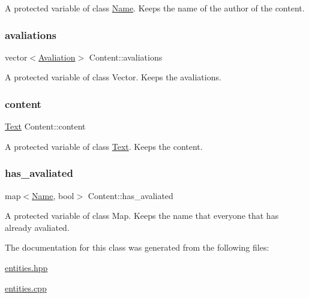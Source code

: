 A protected variable of class \hyperlink{class_name}{Name}. Keeps the name of the author of the content. \mbox{\label{class_content_aaa48d760bd18b48d17204c1532993c3b}} 
\subsubsection{\texorpdfstring{avaliations}{avaliations}}
{\footnotesize\ttfamily vector$<$\hyperlink{class_avaliation}{Avaliation}$>$ Content\+::avaliations\hspace{0.3cm}{\ttfamily [protected]}}

A protected variable of class Vector. Keeps the avaliations. \mbox{\label{class_content_a79390b6e1b8f81832a3b31bae4718148}} 
\subsubsection{\texorpdfstring{content}{content}}
{\footnotesize\ttfamily \hyperlink{class_text}{Text} Content\+::content\hspace{0.3cm}{\ttfamily [protected]}}

A protected variable of class \hyperlink{class_text}{Text}. Keeps the content. \mbox{\label{class_content_a5203ffeb9ce422d8e8ea1d58dd44312a}} 
\subsubsection{\texorpdfstring{has\+\_\+avaliated}{has\_avaliated}}
{\footnotesize\ttfamily map$<$\hyperlink{class_name}{Name}, bool$>$ Content\+::has\+\_\+avaliated\hspace{0.3cm}{\ttfamily [protected]}}

A protected variable of class Map. Keeps the name that everyone that has already avaliated. 

The documentation for this class was generated from the following files\+:\begin{DoxyCompactItemize}
\item 
\hyperlink{entities_8hpp}{entities.\+hpp}\item 
\hyperlink{entities_8cpp}{entities.\+cpp}\end{DoxyCompactItemize}

